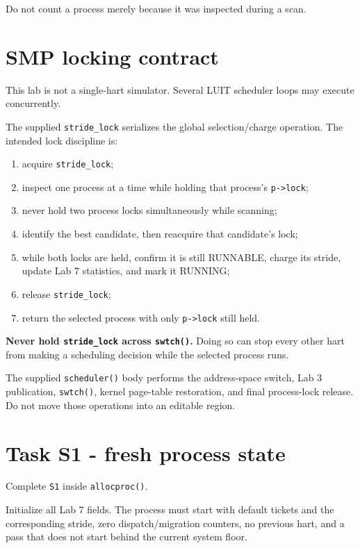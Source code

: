 \documentclass[11pt,a4paper]{article}
\newcommand{\file}[1]{\texttt{#1}}
\begin{document}
Do not count a process merely because it was inspected during a scan.

\section{SMP locking contract}

This lab is not a single-hart simulator. Several LUIT scheduler loops may execute concurrently.

The supplied \file{stride\_lock} serializes the global selection/charge operation. The intended lock discipline is:

\begin{enumerate}
\item acquire \file{stride\_lock};
\item inspect one process at a time while holding that process's \file{p->lock};
\item never hold two process locks simultaneously while scanning;
\item identify the best candidate, then reacquire that candidate's lock;
\item while both locks are held, confirm it is still RUNNABLE, charge its stride, update Lab 7 statistics, and mark it RUNNING;
\item release \file{stride\_lock};
\item return the selected process with only \file{p->lock} still held.
\end{enumerate}

\textbf{Never hold \file{stride\_lock} across \file{swtch()}.} Doing so can stop every other hart from making a scheduling decision while the selected process runs.

The supplied \file{scheduler()} body performs the address-space switch, Lab 3 publication, \file{swtch()}, kernel page-table restoration, and final process-lock release. Do not move those operations into an editable region.

\section{Task S1 - fresh process state}

Complete \file{S1} inside \file{allocproc()}.

Initialize all Lab 7 fields. The process must start with default tickets and the corresponding stride, zero dispatch/migration counters, no previous hart, and a pass that does not start behind the current system floor.
\end{document}
